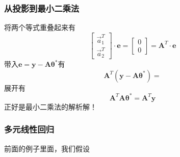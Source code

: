 \documentclass[14pt]{beamer}
\newcommand{\mat}[1]{\bm{#1}}
\renewcommand{\vec}[1]{\bm{#1}}
\newcommand{\MA}{\mat{A}}
\newcommand{\Va}{\Vec{a}}
\newcommand{\Vy}{\vec{y}}
\newcommand{\Ve}{\vec{e}}
\newcommand{\Vt}{\vec{\theta}}
\begin{document}
    \begin{frame}
        \frametitle{从投影到最小二乘法}
        将两个等式重叠起来有
        \begin{equation}
            \begin{bmatrix}
                \Va_1^T\\
                \Va_2^T
            \end{bmatrix}\cdot
            \Ve=\begin{bmatrix}
                0\\
                0
            \end{bmatrix}=
            \MA^T\cdot \Ve
        \end{equation}
        带入$\Ve=\Vy-\MA\Vt^*$有
        \begin{equation}
            \MA^T(\Vy-\MA\Vt^*)=\vec{}
        \end{equation}
        展开有
        \[ \boxed{\MA^T\MA\Vt^*=\MA^T\Vy} \]
        正好是最小二乘法的解析解！
    \end{frame}

    \begin{frame}
        \frametitle{多元线性回归}
        前面的例子里面，我们假设
        
    
    \end{frame}
\end{document}
